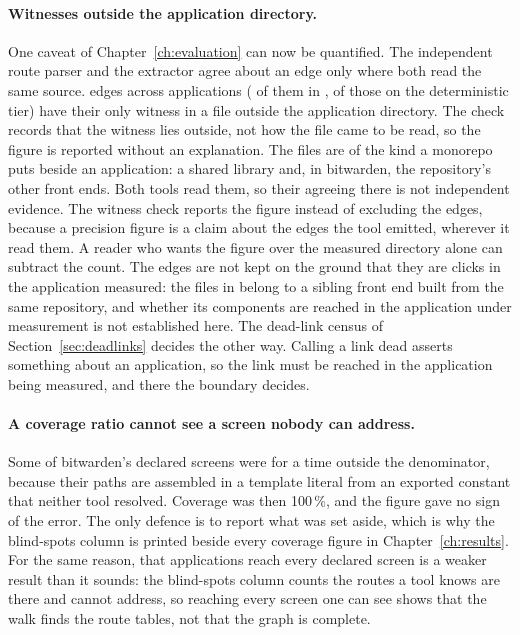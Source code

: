 \paragraph{Witnesses outside the application directory.} One caveat of Chapter~\ref{ch:evaluation} can now be quantified. The independent route parser and the extractor agree about an edge only where both read the same source. \RoundTwoOutsideWitness{} edges across \RoundTwoOutsideWitnessApps{} applications (\RoundTwoOutsideWitnessWorstN{} of them in \RoundTwoOutsideWitnessWorst{}, \RoundTwoOutsideWitnessWorstMust{} of those on the deterministic tier) have their only witness in a file outside the application directory. The check records that the witness lies outside, not how the file came to be read, so the figure is reported without an explanation. The files are of the kind a monorepo puts beside an application: a shared library and, in bitwarden, the repository's other front ends. Both tools read them, so their agreeing there is not independent evidence. The witness check reports the figure instead of excluding the edges, because a precision figure is a claim about the edges the tool emitted, wherever it read them. A reader who wants the figure over the measured directory alone can subtract the count. The edges are not kept on the ground that they are clicks in the application measured: the files in \RoundTwoOutsideWitnessWorst{} belong to a sibling front end built from the same repository, and whether its components are reached in the application under measurement is not established here. The dead-link census of Section~\ref{sec:deadlinks} decides the other way. Calling a link dead asserts something about an application, so the link must be reached in the application being measured, and there the boundary decides.

\paragraph{A coverage ratio cannot see a screen nobody can address.} Some of bitwarden's declared screens were for a time outside the denominator, because their paths are assembled in a template literal from an exported constant that neither tool resolved. Coverage was then 100\,\%, and the figure gave no sign of the error. The only defence is to report what was set aside, which is why the blind-spots column is printed beside every coverage figure in Chapter~\ref{ch:results}. For the same reason, that \RoundTwoFullNodes{} applications reach every declared screen is a weaker result than it sounds: the blind-spots column counts the routes a tool knows are there and cannot address, so reaching every screen one can see shows that the walk finds the route tables, not that the graph is complete.

